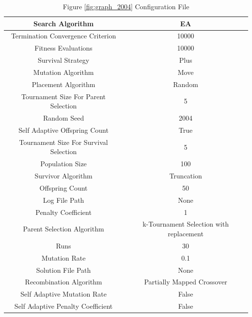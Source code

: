 \documentclass{standalone}
\begin{document}
\begin{table}[!htb]
	\centering
	\caption{Figure \ref{fig:graph_2004} Configuration File}
	\label{tab:graph_2004}
	\begin{tabular}{| c | c |}
		\hline
		Search Algorithm		& EA		 \\
		\hline
		Termination Convergence Criterion		& 10000		 \\
		\hline
		Fitness Evaluations		& 10000		 \\
		\hline
		Survival Strategy		& Plus		 \\
		\hline
		Mutation Algorithm		& Move		 \\
		\hline
		Placement Algorithm		& Random		 \\
		\hline
		Tournament Size For Parent Selection		& 5		 \\
		\hline
		Random Seed		& 2004		 \\
		\hline
		Self Adaptive Offspring Count		& True		 \\
		\hline
		Tournament Size For Survival Selection		& 5		 \\
		\hline
		Population Size		& 100		 \\
		\hline
		Survivor Algorithm		& Truncation		 \\
		\hline
		Offspring Count		& 50		 \\
		\hline
		Log File Path		& None		 \\
		\hline
		Penalty Coefficient		& 1		 \\
		\hline
		Parent Selection Algorithm		& k-Tournament Selection with replacement		 \\
		\hline
		Runs		& 30		 \\
		\hline
		Mutation Rate		& 0.1		 \\
		\hline
		Solution File Path		& None		 \\
		\hline
		Recombination Algorithm		& Partially Mapped Crossover		 \\
		\hline
		Self Adaptive Mutation Rate		& False		 \\
		\hline
		Self Adaptive Penalty Coefficient		& False		 \\
		\hline
	\end{tabular}
\end{table}
\end{document}
